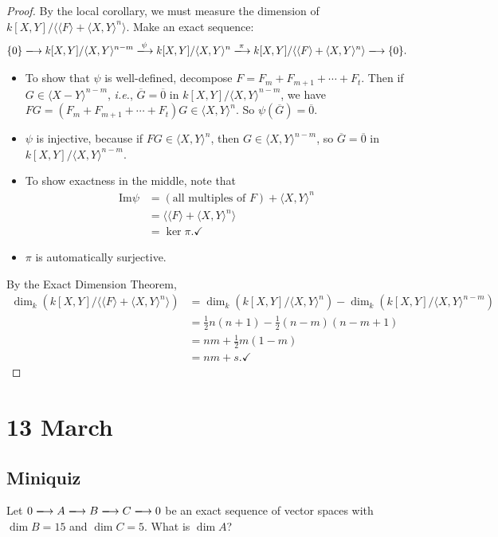 \documentclass[12pt]{article}
\newcommand{\ita}[1]{\textit{#1}}
\newcommand{\vbrack}[1]{\langle #1\rangle}
\theoremstyle{definition}
\begin{document}
\begin{proof}
    By the local corollary, we must measure the dimension of $k[X,Y]/\vbrack{\vbrack{F}+\vbrack{X,Y}^n}$. Make an exact sequence:
    \[\{0\}\xlongrightarrow{}k[X,Y]/\vbrack{X,Y}^{n-m}\xlongrightarrow{\psi}k[X,Y]/\vbrack{X,Y}^n\xlongrightarrow{\pi}k[X,Y]/\vbrack{\vbrack{F}+\vbrack{X,Y}^n}\xlongrightarrow{}\{0\}.\]
    \begin{itemize}
        \item To show that $\psi$ is well-defined, decompose $F=F_m+F_{m+1}+\dotsb+F_t$. Then if $G\in\vbrack{X-Y}^{n-m}$, \ita{i.e.}, $\overline{G}=\overline{0}$ in $k[X,Y]/\vbrack{X,Y}^{n-m}$, we have $FG=(F_m+F_{m+1}+\dotsb+F_t)G\in\vbrack{X,Y}^n$. So $\psi(\overline{G})=\overline{0}$. \checkmark
        \item $\psi$ is injective, because if $FG\in\vbrack{X,Y}^n$, then $G\in\vbrack{X,Y}^{n-m}$, so $\overline{G}=\overline{0}$ in $k[X,Y]/\vbrack{X,Y}^{n-m}$. \checkmark
        \item To show exactness in the middle, note that
        \begin{align*}
            \mathrm{Im}\psi&=(\text{all multiples of }F)+\vbrack{X,Y}^n\\
        &=\vbrack{\vbrack{F}+\vbrack{X,Y}^n}\\
        &=\ker\pi. \checkmark
        \end{align*}
        \item $\pi$ is automatically surjective. \checkmark
    \end{itemize}
    By the Exact Dimension Theorem, 
    \begin{align*}
        \dim_k(k[X,Y]/\vbrack{\vbrack{F}+\vbrack{X,Y}^n})&=\dim_k(k[X,Y]/\vbrack{X,Y}^n)-\dim_k(k[X,Y]/\vbrack{X,Y}^{n-m})\\
        &=\frac{1}{2}n(n+1)-\frac{1}{2}(n-m)(n-m+1)\\
        &=nm+\frac{1}{2}m(1-m)\\
        &=nm+s. \checkmark
    \end{align*}
\end{proof}
\section{13 March}
\subsection{Miniquiz}
Let $0\xlongrightarrow{}A\xlongrightarrow{}B\xlongrightarrow{}C\xlongrightarrow{}0$ be an exact sequence of vector spaces with $\dim B=15$ and $\dim C=5$. What is $\dim A$?
\end{document}
